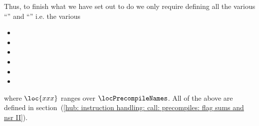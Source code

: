 Thus, to finish what we have set out to do we only require defining all the various
``'' and ``'' i.e. the various
\begin{multicols}{2}
	\begin{itemize}
		\item \locFlagSumXxxFKTH{}
		\item \locFlagSumXxxFKTR{}
		\item \locFlagSumXxxSuccess{}
		\item \locNsrXxxFKTH{}
		\item \locNsrXxxFKTR{}
		\item \locNsrXxxSuccess{}
	\end{itemize}
\end{multicols}
where $\loc{xxx}$ ranges over $\locPrecompileNames$.
All of the above are defined in
section~(\ref{hub: instruction handling: call: precompiles: flag sums and nsr II}).
